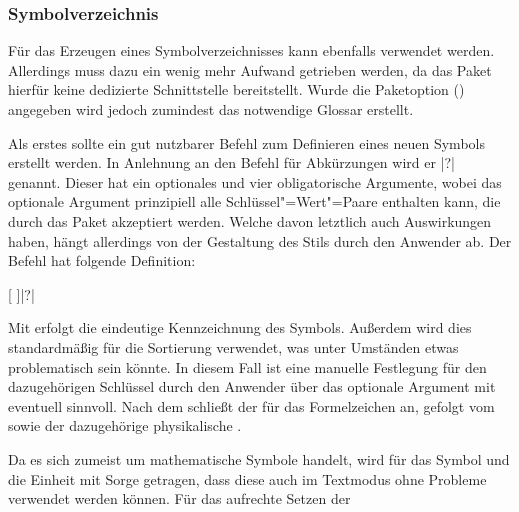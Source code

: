 \documentclass[%
  english,ngerman,%
  cdgeometry=no,DIV=12,%
  automark,%
  listof=toc,%
]{tudscrartcl}
\begin{document}
\subsubsection{Symbolverzeichnis}
Für das Erzeugen eines Symbolverzeichnisses kann ebenfalls  
verwendet werden. Allerdings muss dazu ein wenig mehr Aufwand getrieben werden, 
da das Paket hierfür keine dedizierte Schnittstelle bereitstellt. Wurde die 
Paketoption () angegeben wird jedoch 
zumindest das notwendige Glossar erstellt.

Als erstes sollte ein gut nutzbarer Befehl zum Definieren eines neuen Symbols 
erstellt werden. In Anlehnung an den Befehl für Abkürzungen  
wird er |?| genannt. Dieser hat ein optionales und vier 
obligatorische Argumente, wobei das optionale Argument prinzipiell alle 
Schlüssel"=Wert"=Paare enthalten kann, die durch das Paket  
akzeptiert werden. Welche davon letztlich auch Auswirkungen haben, hängt 
allerdings von der Gestaltung des Stils durch den Anwender ab. Der Befehl hat 
folgende Definition:
%
\begin{quoting}[leftmargin=\parindent]
[%
  \LParameter{}%
]|?|%
\end{quoting}
%
Mit  erfolgt die eindeutige Kennzeichnung des Symbols. Außerdem 
wird dies standardmäßig für die Sortierung verwendet, was unter Umständen etwas
problematisch sein könnte. In diesem Fall ist eine manuelle Festlegung für den 
dazugehörigen Schlüssel durch den Anwender über das optionale Argument mit 
 eventuell sinnvoll. Nach dem  
schließt der  für das Formelzeichen an, gefolgt vom  
sowie der dazugehörige physikalische .
%
\CodeHook{\let\newcommand\renewcommand}
\begin{Preamble*}
\newcommand*{\newformulasymbol}[5][]{%
  \newglossaryentry{#2}{%
    type=symbols,%
    name={#3},%
    description={\nopostdesc},%
    symbol={\ensuremath{#4}},%
    user1={\ensuremath{\mathrm{#5}}},%
    sort={#2},%
    #1%
  }%
}

\end{Preamble*}
%
Da es sich zumeist um mathematische Symbole handelt, wird für das Symbol und 
die Einheit mit  Sorge getragen, dass diese auch im 
Textmodus ohne Probleme verwendet werden können. Für das aufrechte Setzen der 
\end{document}
